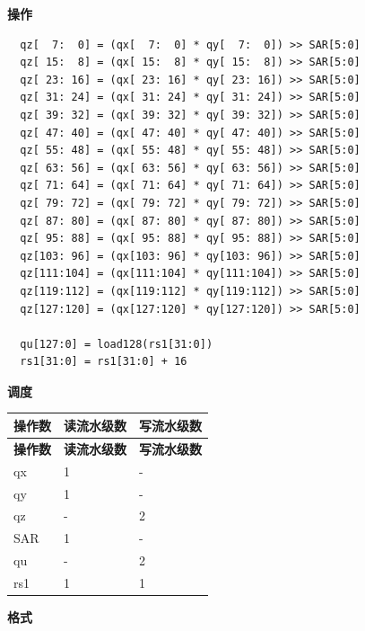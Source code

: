 \textbf{操作}\\
\begin{lstlisting}
  qz[  7:  0] = (qx[  7:  0] * qy[  7:  0]) >> SAR[5:0]
  qz[ 15:  8] = (qx[ 15:  8] * qy[ 15:  8]) >> SAR[5:0]
  qz[ 23: 16] = (qx[ 23: 16] * qy[ 23: 16]) >> SAR[5:0]
  qz[ 31: 24] = (qx[ 31: 24] * qy[ 31: 24]) >> SAR[5:0]
  qz[ 39: 32] = (qx[ 39: 32] * qy[ 39: 32]) >> SAR[5:0]
  qz[ 47: 40] = (qx[ 47: 40] * qy[ 47: 40]) >> SAR[5:0]
  qz[ 55: 48] = (qx[ 55: 48] * qy[ 55: 48]) >> SAR[5:0]
  qz[ 63: 56] = (qx[ 63: 56] * qy[ 63: 56]) >> SAR[5:0]
  qz[ 71: 64] = (qx[ 71: 64] * qy[ 71: 64]) >> SAR[5:0]
  qz[ 79: 72] = (qx[ 79: 72] * qy[ 79: 72]) >> SAR[5:0]
  qz[ 87: 80] = (qx[ 87: 80] * qy[ 87: 80]) >> SAR[5:0]
  qz[ 95: 88] = (qx[ 95: 88] * qy[ 95: 88]) >> SAR[5:0]
  qz[103: 96] = (qx[103: 96] * qy[103: 96]) >> SAR[5:0]
  qz[111:104] = (qx[111:104] * qy[111:104]) >> SAR[5:0]
  qz[119:112] = (qx[119:112] * qy[119:112]) >> SAR[5:0]
  qz[127:120] = (qx[127:120] * qy[127:120]) >> SAR[5:0]

  qu[127:0] = load128(rs1[31:0])
  rs1[31:0] = rs1[31:0] + 16
\end{lstlisting}


\textbf{调度}\\
\begin{longtable}[c]{|l|l|l|}
    \hline
    \rowcolor{lightgray}
    \textbf{操作数} & \textbf{读流水级数} & \textbf{写流水级数} \\\hline
    \endfirsthead
    \hline
    \rowcolor{lightgray}
     \textbf{操作数} & \textbf{读流水级数} & \textbf{写流水级数} \\\hline
    \endhead
    \hline
    \endfoot

    qx & 1 & - \\\hline
  qy & 1 & - \\\hline
     qz & - & 2 \\\hline
    SAR & 1 & - \\\hline
    qu & - & 2 \\\hline
    rs1 & 1 & 1

\end{longtable}

\textbf{格式}\\

